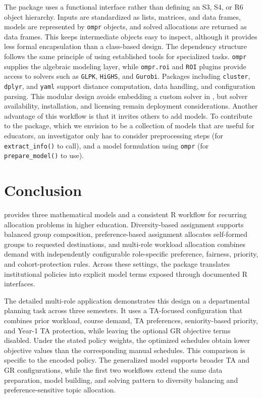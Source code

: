 The package uses a functional interface rather than defining an S3, S4, or R6
object hierarchy. Inputs are standardized as lists, matrices, and data frames,
models are represented by \texttt{ompr} objects, and solved allocations are returned as
data frames. This keeps intermediate objects easy to inspect, although it provides
less formal encapsulation than a class-based design. The dependency structure
follows the same principle of using established tools for specialized tasks.
\texttt{ompr} supplies the algebraic modeling layer, while \texttt{ompr.roi} and \texttt{ROI} plugins
provide access to solvers such as \texttt{GLPK}, \texttt{HiGHS}, and \texttt{Gurobi}. Packages
including \texttt{cluster}, \texttt{dplyr}, and \texttt{yaml} support distance computation, data
handling, and configuration parsing. This modular design avoids embedding a
custom solver in , but solver availability, installation, and licensing
remain deployment considerations. Another advantage of this workflow is that it
invites others to add models. To contribute to the package, which we envision
to be a collection of models that are useful for educators, an investigator
only has to consider preprocessing steps (for \texttt{extract\_info()} to call), and
a model formulation using \texttt{ompr} (for \texttt{prepare\_model()} to use).

\section{Conclusion}\label{conclusion}

 provides three mathematical models and a consistent R workflow for
recurring allocation problems in higher education. Diversity-based assignment
supports balanced group composition, preference-based assignment allocates
self-formed groups to requested destinations, and multi-role workload allocation
combines demand with independently configurable role-specific preference,
fairness, priority, and cohort-protection rules. Across these settings, the
package translates institutional policies into explicit model terms exposed
through documented R interfaces.

The detailed multi-role application demonstrates this design on a departmental
planning task across three semesters. It uses a TA-focused configuration that
combines prior workload, course demand, TA preferences, seniority-based priority,
and Year-1 TA protection, while leaving the optional GR objective terms
disabled. Under the stated policy weights, the optimized schedules obtain lower
objective values than the corresponding manual schedules. This comparison is
specific to the encoded policy. The generalized model supports broader TA and
GR configurations, while the first two workflows extend the same data
preparation, model building, and solving pattern to diversity balancing and
preference-sensitive topic allocation.


